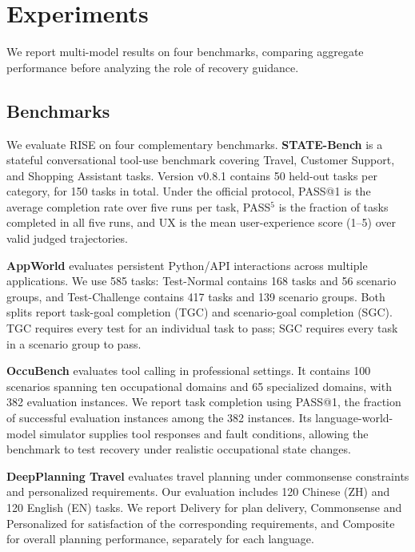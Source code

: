 \documentclass{article}
\begin{document}
\section{Experiments}
We report multi-model results on four benchmarks, comparing aggregate performance before analyzing the role of recovery guidance.
\subsection{Benchmarks}
We evaluate RISE on four complementary benchmarks. \textbf{STATE-Bench} is a stateful conversational tool-use benchmark covering Travel, Customer Support, and Shopping Assistant tasks. Version v0.8.1 contains 50 held-out tasks per category, for 150 tasks in total. Under the official protocol, PASS@1 is the average completion rate over five runs per task, PASS$^5$ is the fraction of tasks completed in all five runs, and UX is the mean user-experience score (1--5) over valid judged trajectories.

\textbf{AppWorld} evaluates persistent Python/API interactions across multiple applications. We use 585 tasks: Test-Normal contains 168 tasks and 56 scenario groups, and Test-Challenge contains 417 tasks and 139 scenario groups. Both splits report task-goal completion (TGC) and scenario-goal completion (SGC). TGC requires every test for an individual task to pass; SGC requires every task in a scenario group to pass.

\textbf{OccuBench} evaluates tool calling in professional settings. It contains 100 scenarios spanning ten occupational domains and 65 specialized domains, with 382 evaluation instances. We report task completion using PASS@1, the fraction of successful evaluation instances among the 382 instances. Its language-world-model simulator supplies tool responses and fault conditions, allowing the benchmark to test recovery under realistic occupational state changes.

\textbf{DeepPlanning Travel} evaluates travel planning under commonsense constraints and personalized requirements. Our evaluation includes 120 Chinese (ZH) and 120 English (EN) tasks. We report Delivery for plan delivery, Commonsense and Personalized for satisfaction of the corresponding requirements, and Composite for overall planning performance, separately for each language.
\end{document}
